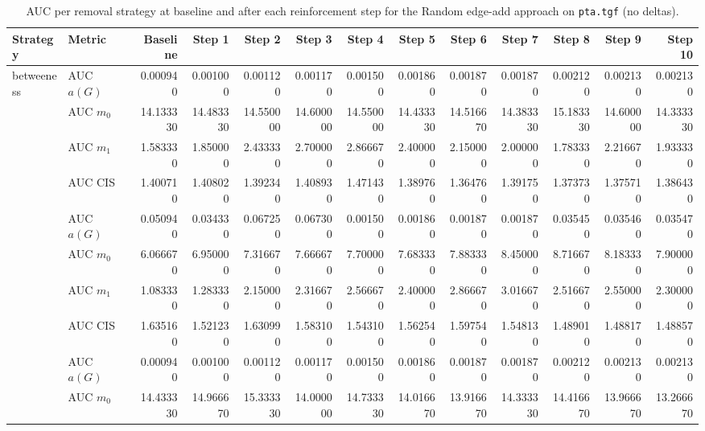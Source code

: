 \begin{table}[htbp]
  \centering
  \caption{AUC per removal strategy at baseline and after each reinforcement step for the Random edge-add approach on \texttt{pta.tgf} (no deltas).}
  \label{tab:pta-random_add-auc}
\setlength{\tabcolsep}{2.5pt}
  \begin{tabular}{llrrrrrrrrrrr}
    \toprule
    \textbf{Strategy} & \textbf{Metric} & \textbf{Baseline} & \textbf{Step 1} & \textbf{Step 2} & \textbf{Step 3} & \textbf{Step 4} & \textbf{Step 5} & \textbf{Step 6} & \textbf{Step 7} & \textbf{Step 8} & \textbf{Step 9} & \textbf{Step 10} \\
    \midrule
    \multirow{4}{*}{betweeness} & AUC $a(G)$ & 0.000940 & 0.001000 & 0.001120 & 0.001170 & 0.001500 & 0.001860 & 0.001870 & 0.001870 & 0.002120 & 0.002130 & 0.002130 \\
    & AUC $m_0$ & 14.133330 & 14.483330 & 14.550000 & 14.600000 & 14.550000 & 14.433330 & 14.516670 & 14.383330 & 15.183330 & 14.600000 & 14.333330 \\
    & AUC $m_1$ & 1.583330 & 1.850000 & 2.433330 & 2.700000 & 2.866670 & 2.400000 & 2.150000 & 2.000000 & 1.783330 & 2.216670 & 1.933330 \\
    & AUC CIS & 1.400710 & 1.408020 & 1.392340 & 1.408930 & 1.471430 & 1.389760 & 1.364760 & 1.391750 & 1.373730 & 1.375710 & 1.386430 \\
    \addlinespace
    \multirow{4}{*}{closeness} & AUC $a(G)$ & 0.050940 & 0.034330 & 0.067250 & 0.067300 & 0.001500 & 0.001860 & 0.001870 & 0.001870 & 0.035450 & 0.035460 & 0.035470 \\
    & AUC $m_0$ & 6.066670 & 6.950000 & 7.316670 & 7.666670 & 7.700000 & 7.683330 & 7.883330 & 8.450000 & 8.716670 & 8.183330 & 7.900000 \\
    & AUC $m_1$ & 1.083330 & 1.283330 & 2.150000 & 2.316670 & 2.566670 & 2.400000 & 2.866670 & 3.016670 & 2.516670 & 2.550000 & 2.300000 \\
    & AUC CIS & 1.635160 & 1.521230 & 1.630990 & 1.583100 & 1.543100 & 1.562540 & 1.597540 & 1.548130 & 1.489010 & 1.488170 & 1.488570 \\
    \addlinespace
    \multirow{4}{*}{core influence} & AUC $a(G)$ & 0.000940 & 0.001000 & 0.001120 & 0.001170 & 0.001500 & 0.001860 & 0.001870 & 0.001870 & 0.002120 & 0.002130 & 0.002130 \\
    & AUC $m_0$ & 14.433330 & 14.966670 & 15.333330 & 14.000000 & 14.733330 & 14.016670 & 13.916670 & 14.333330 & 14.416670 & 13.966670 & 13.266670 \\

\end{tabular}
\end{table}
